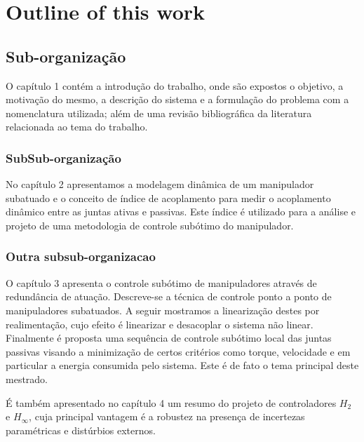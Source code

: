 
\section{Outline of this work}
\subsection{Sub-organização}
O capítulo 1 contém a introdução do trabalho, onde são expostos o objetivo, a motivação do mesmo, a descrição do sistema e a formulação do problema com a nomenclatura utilizada; além de uma revisão bibliográfica da literatura relacionada ao tema do trabalho.

\subsubsection{SubSub-organização}

No capítulo 2 apresentamos a modelagem dinâmica de um manipulador subatuado e o conceito de índice de acoplamento para medir o acoplamento dinâmico entre as juntas ativas e passivas. Este índice é utilizado para a análise e projeto de uma metodologia de controle subótimo do manipulador.

\subsubsection{Outra subsub-organizacao}

O capítulo 3 apresenta o controle subótimo de manipuladores através de redundância de atuação. Descreve-se a técnica de controle ponto a ponto de manipuladores subatuados. A seguir mostramos  a linearização destes por realimentação, cujo efeito é linearizar e desacoplar o sistema não linear. Finalmente é proposta uma sequência de controle subótimo local das juntas passivas visando a minimização de certos critérios como torque, velocidade e em particular a energia consumida pelo sistema. Este é de fato o tema principal deste mestrado.

É também apresentado no capítulo 4 um resumo do projeto de controladores  $H_{2}$ e $H_{\infty}$, cuja principal vantagem é a robustez na presença de incertezas paramétricas e distúrbios externos.

